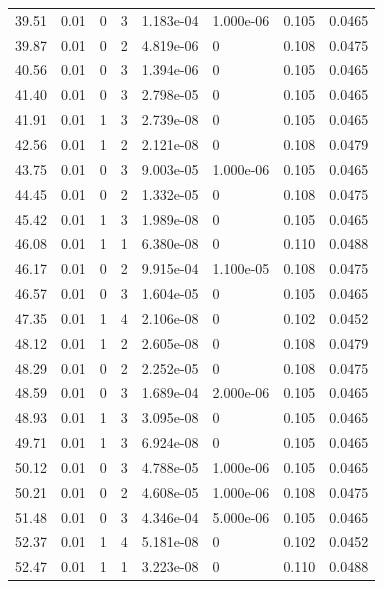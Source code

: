 \documentclass[preview]{standalone}
\begin{document}
{{{\begin{tabular}{L{1.2cm}C{1.2cm} C{0.3cm}C{0.5cm} C{1.4cm}C{1.4cm} C{1.4cm}C{1.4cm}}
  39.51  &  0.01  & 0     &  3 &  1.183e-04  & 1.000e-06  & 0.105 &  0.0465   \\ 
  39.87  &  0.01  & 0     &  2 &  4.819e-06  & 0  & 0.108 &  0.0475   \\ 
  40.56  &  0.01  & 0     &  3 &  1.394e-06  & 0  & 0.105 &  0.0465   \\ 
  41.40  &  0.01  & 0     &  3 &  2.798e-05  & 0  & 0.105 &  0.0465   \\ 
  41.91  &  0.01  & 1     &  3 &  2.739e-08  & 0  & 0.105 &  0.0465   \\ 
  42.56  &  0.01  & 1     &  2 &  2.121e-08  & 0  & 0.108 &  0.0479   \\ 
  43.75  &  0.01  & 0     &  3 &  9.003e-05  & 1.000e-06  & 0.105 &  0.0465   \\ 
  44.45  &  0.01  & 0     &  2 &  1.332e-05  & 0  & 0.108 &  0.0475   \\ 
  45.42  &  0.01  & 1     &  3 &  1.989e-08  & 0  & 0.105 &  0.0465   \\ 
  46.08  &  0.01  & 1     &  1 &  6.380e-08  & 0  & 0.110 &  0.0488   \\ 
  46.17  &  0.01  & 0     &  2 &  9.915e-04  & 1.100e-05  & 0.108 &  0.0475   \\ 
  46.57  &  0.01  & 0     &  3 &  1.604e-05  & 0  & 0.105 &  0.0465   \\ 
  47.35  &  0.01  & 1     &  4 &  2.106e-08  & 0  & 0.102 &  0.0452   \\ 
  48.12  &  0.01  & 1     &  2 &  2.605e-08  & 0  & 0.108 &  0.0479   \\ 
  48.29  &  0.01  & 0     &  2 &  2.252e-05  & 0  & 0.108 &  0.0475   \\ 
  48.59  &  0.01  & 0     &  3 &  1.689e-04  & 2.000e-06  & 0.105 &  0.0465   \\ 
  48.93  &  0.01  & 1     &  3 &  3.095e-08  & 0  & 0.105 &  0.0465   \\ 
  49.71  &  0.01  & 1     &  3 &  6.924e-08  & 0  & 0.105 &  0.0465   \\ 
  50.12  &  0.01  & 0     &  3 &  4.788e-05  & 1.000e-06  & 0.105 &  0.0465   \\ 
  50.21  &  0.01  & 0     &  2 &  4.608e-05  & 1.000e-06  & 0.108 &  0.0475   \\ 
  51.48  &  0.01  & 0     &  3 &  4.346e-04  & 5.000e-06  & 0.105 &  0.0465   \\ 
  52.37  &  0.01  & 1     &  4 &  5.181e-08  & 0  & 0.102 &  0.0452   \\ 
  52.47  &  0.01  & 1     &  1 &  3.223e-08  & 0  & 0.110 &  0.0488   \\ 

\end{tabular}}}}
\end{document}
